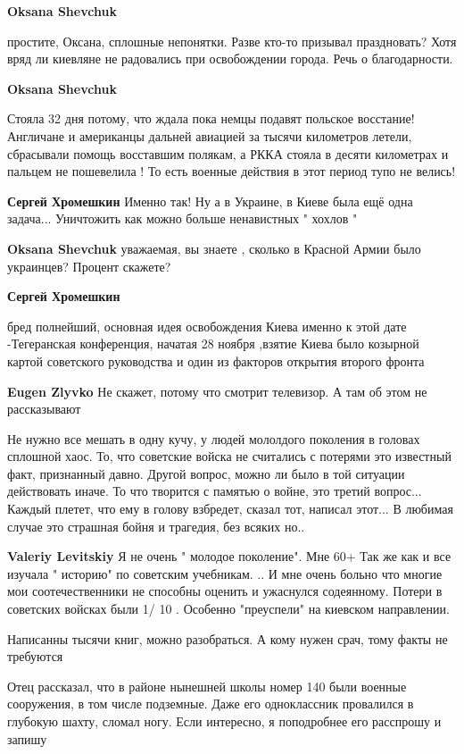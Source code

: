 \begin{itemize}
\begin{itemize}
\begin{itemize}
\textbf{Oksana Shevchuk} 

простите, Оксана, сплошные непонятки. Разве кто-то призывал праздновать? Хотя
вряд ли киевляне не радовались при освобождении города. Речь о благодарности.

\textbf{Oksana Shevchuk} 

Стояла 32 дня потому, что ждала пока немцы подавят польское восстание!
Англичане и американцы дальней авиацией за тысячи километров летели, сбрасывали
помощь восставшим полякам, а РККА стояла в десяти километрах и пальцем не
пошевелила ! То есть военные действия в этот период тупо не велись!

\textbf{Сергей Хромешкин}
Именно так!
Ну а в Украине, в Киеве была ещё одна задача...
Уничтожить как можно больше ненавистных " хохлов "

\textbf{Oksana Shevchuk} уважаемая, вы знаете , сколько в Красной Армии было украинцев? Процент скажете?

\textbf{Сергей Хромешкин} 

бред полнейший, основная идея освобождения Киева именно к этой дате
-Тегеранская конференция, начатая 28 ноября ,взятие Киева было козырной картой
советского руководства и один из факторов открытия второго фронта

\textbf{Eugen Zlyvko} Не скажет, потому что смотрит телевизор. А там об этом не рассказывают

\end{itemize} %


Не нужно все мешать в одну кучу, у людей мололдого поколения в головах сплошной
хаос. То, что советские войска не считались с потерями это известный
факт, признанный давно. Другой вопрос, можно ли было в той ситуации действовать
иначе. То что творится с памятью о войне, это третий вопрос... Каждый плетет, что
ему в голову взбредет, сказал тот, написал этот... В любимая случае это страшная
бойня и трагедия, без всяких но..

\begin{itemize} %
\textbf{Valeriy Levitskiy}
Я не очень " молодое поколение". Мне 60+
Так же как и все изучала " историю" по советским учебникам. ..
И мне очень больно что многие мои соотечественники не способны оценить и ужаснулся содеянному. Потери в советских войсках были 1/ 10 . Особенно "преуспели" на киевском направлении.
\end{itemize} %

Написанны тысячи книг, можно разобраться. А кому нужен срач, тому факты не требуются

\end{itemize} %


Отец рассказал, что в районе нынешней школы номер 140 были военные сооружения,
в том числе подземные. Даже его одноклассник провалился в глубокую шахту,
сломал ногу. Если интересно, я поподробнее его расспрошу и запишу

\end{itemize} %
